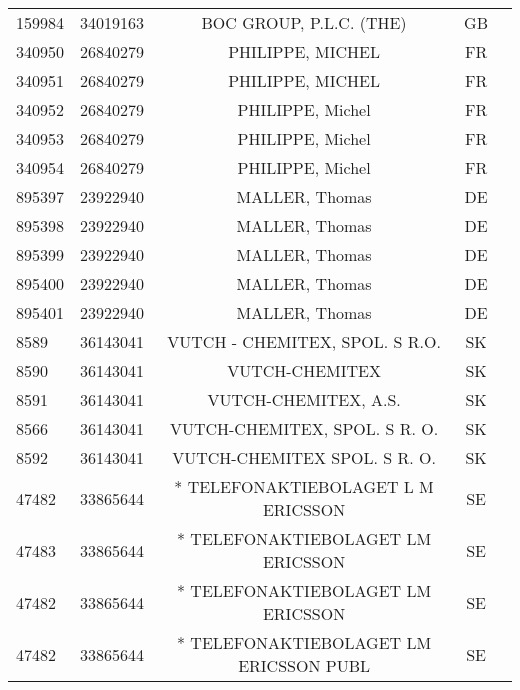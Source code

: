 \begin{longtable}{|l|c|c|c|c|}
    159984 &   34019163 &                            BOC GROUP, P.L.C. (THE) &      GB \\
    340950 &   26840279 &                                   PHILIPPE, MICHEL &      FR \\
    340951 &   26840279 &                                   PHILIPPE, MICHEL &      FR \\
    340952 &   26840279 &                                   PHILIPPE, Michel &      FR \\
    340953 &   26840279 &                                   PHILIPPE, Michel &      FR \\
    340954 &   26840279 &                                   PHILIPPE, Michel &      FR \\
    895397 &   23922940 &                                     MALLER, Thomas &      DE \\
    895398 &   23922940 &                                     MALLER, Thomas &      DE \\
    895399 &   23922940 &                                     MALLER, Thomas &      DE \\
    895400 &   23922940 &                                     MALLER, Thomas &      DE \\
    895401 &   23922940 &                                     MALLER, Thomas &      DE \\
      8589 &   36143041 &                     VUTCH - CHEMITEX, SPOL. S R.O. &      SK \\
      8590 &   36143041 &                                     VUTCH-CHEMITEX &      SK \\
      8591 &   36143041 &                               VUTCH-CHEMITEX, A.S. &      SK \\
      8566 &   36143041 &                      VUTCH-CHEMITEX, SPOL. S R. O. &      SK \\
      8592 &   36143041 &                       VUTCH-CHEMITEX SPOL. S R. O. &      SK \\
     47482 &   33865644 &                 * TELEFONAKTIEBOLAGET L M ERICSSON &      SE \\
     47483 &   33865644 &                  * TELEFONAKTIEBOLAGET LM ERICSSON &      SE \\
     47482 &   33865644 &                  * TELEFONAKTIEBOLAGET LM ERICSSON &      SE \\
     47482 &   33865644 &             * TELEFONAKTIEBOLAGET LM ERICSSON PUBL &      SE \\

\end{longtable}
